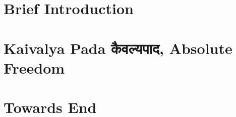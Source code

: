 \section[Intro]{Brief Introduction}


\section[Kaivalyapad]{Kaivalya Pada कैवल्यपाद, Absolute Freedom}


\section[End]{Towards End}

